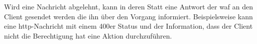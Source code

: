Wird eine Nachricht abgelehnt, kann in deren Statt eine Antwort der \ac{waf} an den Client gesendet werden die ihn über den Vorgang informiert.
Beispielsweise kann eine \ac{http}-Nachricht mit einem 400er Status und der Information, dass der Client nicht die Berechtigung hat eine Aktion durchzuführen.



